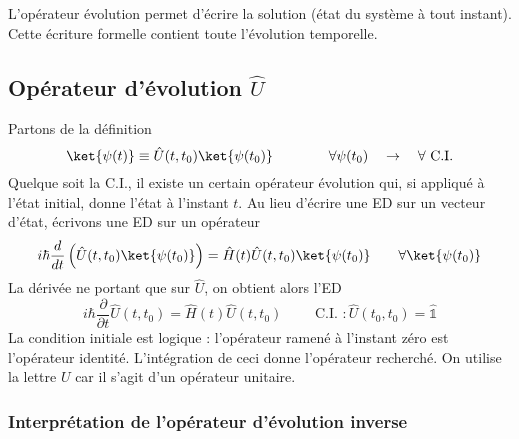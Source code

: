 	L'opérateur évolution  permet d'écrire la solution (état du système à tout instant). Cette 
	écriture formelle contient toute l'évolution temporelle. 

	\subsection{Opérateur d'évolution $\hat{U}$}
	Partons de la définition
	\begin{equation}
	\ket{\psi(t)} \equiv \hat{U}(t,t_0)\ket{\psi(t_0)}\qquad\qquad\forall \psi(t_0)\quad\rightarrow\quad 
	\forall \text{ C.I.}
	\end{equation}
	Quelque soit la C.I., il existe un certain opérateur évolution qui, si appliqué à l'état initial, 
	donne l'état à l'instant $t$. Au lieu d'écrire une ED sur un vecteur d'état, écrivons une ED 
	sur un opérateur
	\begin{equation}
	i\hbar \dfrac{d}{dt}\left(\hat{U}(t,t_0)\ket{\psi(t_0)}\right) = \hat{H}(t)\hat{U}(t,t_0)\ket{\psi(t_0)}
	\qquad \forall \ket{\psi(t_0)}
	\end{equation}
	La dérivée ne portant que sur $\hat{U}$, on obtient alors l'ED
	\begin{equation}
	i\hbar \dfrac{\partial}{\partial t}\hat{U}(t,t_0) = \hat{H}(t)\hat{U}(t,t_0)\qquad \text{ C.I. } : 
	\hat{U}(t_0,t_0) = \hat{\mathbb{1}}
	\label{eq:2.62}
	\end{equation}
	La condition initiale est logique : l'opérateur ramené à l'instant zéro est l'opérateur identité.
	L'intégration de ceci donne l'opérateur recherché. On utilise la lettre $U$ car il s'agit d'un 
	opérateur unitaire. 
	
	\subsubsection{Interprétation de l'opérateur d'évolution inverse}	
	
